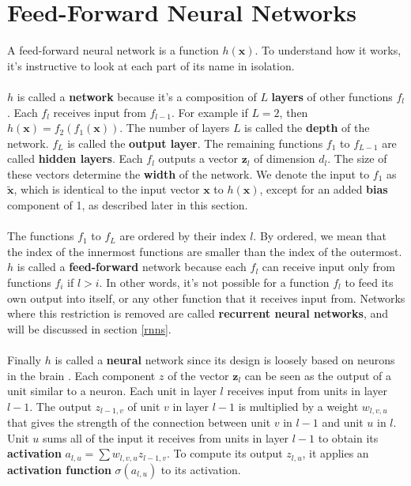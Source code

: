 \section{Feed-Forward Neural Networks}
A feed-forward neural network is a function $h(\mathbf{x})$. To understand how it works, it's instructive to look at each part of its name in isolation.
\\\\
$h$ is called a \textbf{network} because it's a composition of $L$ \textbf{layers} of other functions $f_l$. Each $f_l$ receives input from $f_{l-1}$. For example if $L = 2$, then $h(\mathbf{x}) = f_2(f_1(\mathbf{x}))$. The number of layers $L$ is called the \textbf{depth} of the network. $f_L$ is called the \textbf{output layer}. The remaining functions $f_1$ to $f_{L-1}$ are called \textbf{hidden layers}. Each $f_l$ outputs a vector $\mathbf{z}_l$ of dimension $d_l$. The size of these vectors determine the \textbf{width} of the network. We denote the input to $f_1$ as $\tilde{\mathbf{x}}$, which is identical to the input vector $\mathbf{x}$ to $h(\mathbf{x})$, except for an added \textbf{bias} component of 1, as described later in this section.
\\\\
The functions $f_1$ to $f_L$ are ordered by their index $l$. By ordered, we mean that the index of the innermost functions are smaller than the index of the outermost. $h$ is called a \textbf{feed-forward} network because each $f_l$ can receive input only from functions $f_i$ if $l > i$. In other words, it's not possible for a function $f_l$ to feed its own output into itself, or any other function that it receives input from. Networks where this restriction is removed are called \textbf{recurrent neural networks}, and will be discussed in section \ref{rnns}.
\\\\
Finally $h$ is called a \textbf{neural} network since its design is loosely based on neurons in the brain \citep{goodfellow16}. Each component $z$ of the vector $\mathbf{z}_l$ can be seen as the output of a unit similar to a neuron. Each unit in layer $l$ receives input from units in layer $l-1$. The output $z_{l-1,v}$ of unit $v$ in layer $l-1$ is multiplied by a weight $w_{l,v,u}$ that gives the strength of the connection between unit $v$ in $l-1$ and unit $u$ in $l$. Unit $u$ sums all of the input it receives from units in layer $l-1$ to obtain its \textbf{activation} $a_{l,u} = \sum w_{l,v,u}z_{l-1,v}$. To compute its output $z_{l,u}$, it applies an \textbf{activation function} $\sigma(a_{l,u})$ to its activation.

